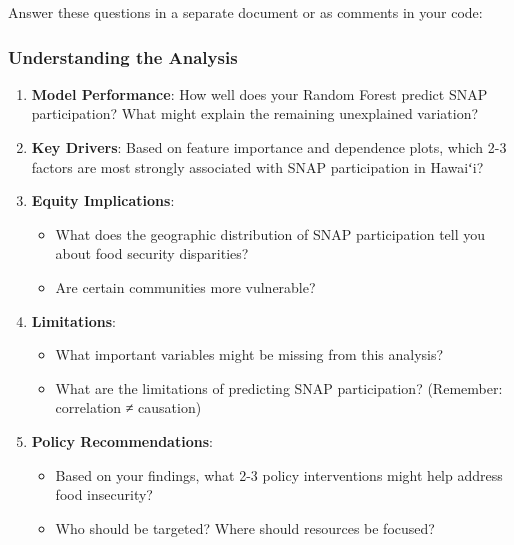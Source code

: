 \documentclass[
  letterpaper,
  DIV=11,
  numbers=noendperiod]{scrartcl}
\providecommand{\tightlist}{%
  \setlength{\itemsep}{0pt}\setlength{\parskip}{0pt}}\usepackage{longtable,booktabs,array}
\begin{document}
\begin{tcolorbox}[enhanced jigsaw, title=\textcolor{quarto-callout-important-color}{\faExclamation}\hspace{0.5em}{Final Reflection Questions}, titlerule=0mm, coltitle=black, colbacktitle=quarto-callout-important-color!10!white, colback=white, left=2mm, toprule=.15mm, opacitybacktitle=0.6, toptitle=1mm, colframe=quarto-callout-important-color-frame, bottomtitle=1mm, arc=.35mm, bottomrule=.15mm, breakable, leftrule=.75mm, opacityback=0, rightrule=.15mm]

Answer these questions in a separate document or as comments in your
code:

\subsubsection{Understanding the
Analysis}\label{understanding-the-analysis}

\begin{enumerate}
\def\labelenumi{\arabic{enumi}.}
\item
  \textbf{Model Performance}: How well does your Random Forest predict
  SNAP participation? What might explain the remaining unexplained
  variation?
\item
  \textbf{Key Drivers}: Based on feature importance and dependence
  plots, which 2-3 factors are most strongly associated with SNAP
  participation in Hawaiʻi?
\item
  \textbf{Equity Implications}:

  \begin{itemize}
  \tightlist
  \item
    What does the geographic distribution of SNAP participation tell you
    about food security disparities?
  \item
    Are certain communities more vulnerable?
  \end{itemize}
\item
  \textbf{Limitations}:

  \begin{itemize}
  \tightlist
  \item
    What important variables might be missing from this analysis?
  \item
    What are the limitations of predicting SNAP participation?
    (Remember: correlation ≠ causation)
  \end{itemize}
\item
  \textbf{Policy Recommendations}:

  \begin{itemize}
  \tightlist
  \item
    Based on your findings, what 2-3 policy interventions might help
    address food insecurity?
  \item
    Who should be targeted? Where should resources be focused?
  \end{itemize}
\end{enumerate}


\end{tcolorbox}
\end{document}
